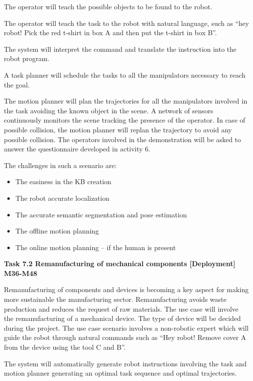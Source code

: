 \begin{longtable}[]
{\begin{minipage}[t]{\linewidth}
The operator will teach the possible objects to be found to the robot.

The operator will teach the task to the robot with natural language,
such as ``hey robot! Pick the red t-shirt in box A and then put the
t-shirt in box B''.

The system will interpret the command and translate the instruction into
the robot program.

A task planner will schedule the tasks to all the manipulators necessary
to reach the goal.

The motion planner will plan the trajectories for all the manipulators
involved in the task avoiding the known object in the scene. A network
of sensors continuously monitors the scene tracking the presence of the
operator. In case of possible collision, the motion planner will replan
the trajectory to avoid any possible collision. The operators involved
in the demonstration will be asked to answer the questionnaire developed
in activity 6.

The challenges in such a scenario are:

\begin{itemize}
\item
  The easiness in the KB creation
\item
  The robot accurate localization
\item
  The accurate semantic segmentation and pose estimation
\item
  The offline motion planning
\item
  The online motion planning -- if the human is present
\end{itemize}

\textbf{Task 7.2 Remanufacturing of mechanical components
{[}Deployment{]} M36-M48}

Remanufacturing of components and devices is becoming a key aspect for
making more sustainable the manufacturing sector. Remanufacturing avoids
waste production and reduces the request of raw materials. The use case
will involve the remanufacturing of a mechanical device. The type of
device will be decided during the project. The use case scenario
involves a non-robotic expert which will guide the robot through natural
commands such as ``Hey robot! Remove cover A from the device using the
tool C and B''.

The system will automatically generate robot instructions involving the
task and motion planner generating an optimal task sequence and optimal
trajectories.


\end{minipage}}
\end{longtable}
